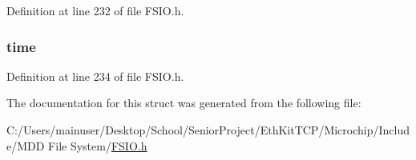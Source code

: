 Definition at line 232 of file F\+S\+I\+O.\+h.

\hypertarget{struct_f_s_f_i_l_e_a6481def729909de2fc2fe88d34797730}{}
\subsubsection[{time}]{ time}\label{struct_f_s_f_i_l_e_a6481def729909de2fc2fe88d34797730}


Definition at line 234 of file F\+S\+I\+O.\+h.



The documentation for this struct was generated from the following file\+:\begin{DoxyCompactItemize}
\item 
C\+:/\+Users/mainuser/\+Desktop/\+School/\+Senior\+Project/\+Eth\+Kit\+T\+C\+P/\+Microchip/\+Include/\+M\+D\+D File System/\hyperlink{_f_s_i_o_8h}{F\+S\+I\+O.\+h}\end{DoxyCompactItemize}
